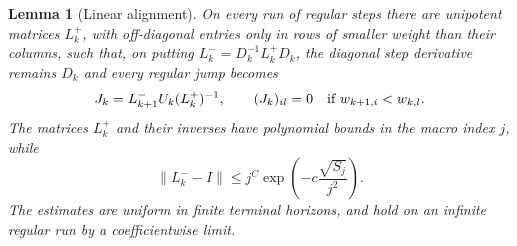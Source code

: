 \documentclass[11pt]{article}
\newtheorem{lemma}[theorem]{Lemma}
\theoremstyle{definition}
\theoremstyle{remark}
\newcommand{\norm}[1]{\lVert#1\rVert}
\numberwithin{equation}{section}
\begin{document}
\begin{lemma}[Linear alignment]\label{lem:linear-alignment}
On every run of regular steps there are unipotent matrices $L_k^+$,
with off-diagonal entries only in rows of smaller weight than their
columns, such that, on putting $L_k^-=D_k^{-1}L_k^+D_k$, the diagonal
step derivative remains $D_k$ and every regular jump becomes
\begin{equation}
 J_k=L_{k+1}^-U_k(L_k^+)^{-1},\qquad
 (J_k)_{il}=0\quad\hbox{if }w_{k+1,i}<w_{k,l}.
 \label{eq:dyn:aligned-jump}
\end{equation}
The matrices $L_k^+$ and their inverses have polynomial bounds in the
macro index $j$, while
\begin{equation}
 \norm{L_k^- -I}
 \le j^C\exp\left(-c\frac{\sqrt{S_j}}{j^2}\right).
 \label{eq:dyn:small-start-change}
\end{equation}
The estimates are uniform in finite terminal horizons, and hold on an
infinite regular run by a coefficientwise limit.
\end{lemma}
\end{document}
